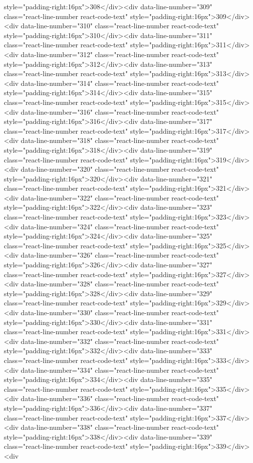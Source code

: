 style="padding-right:16px">308</div><div data-line-number="309" class="react-line-number react-code-text" style="padding-right:16px">309</div><div data-line-number="310" class="react-line-number react-code-text" style="padding-right:16px">310</div><div data-line-number="311" class="react-line-number react-code-text" style="padding-right:16px">311</div><div data-line-number="312" class="react-line-number react-code-text" style="padding-right:16px">312</div><div data-line-number="313" class="react-line-number react-code-text" style="padding-right:16px">313</div><div data-line-number="314" class="react-line-number react-code-text" style="padding-right:16px">314</div><div data-line-number="315" class="react-line-number react-code-text" style="padding-right:16px">315</div><div data-line-number="316" class="react-line-number react-code-text" style="padding-right:16px">316</div><div data-line-number="317" class="react-line-number react-code-text" style="padding-right:16px">317</div><div data-line-number="318" class="react-line-number react-code-text" style="padding-right:16px">318</div><div data-line-number="319" class="react-line-number react-code-text" style="padding-right:16px">319</div><div data-line-number="320" class="react-line-number react-code-text" style="padding-right:16px">320</div><div data-line-number="321" class="react-line-number react-code-text" style="padding-right:16px">321</div><div data-line-number="322" class="react-line-number react-code-text" style="padding-right:16px">322</div><div data-line-number="323" class="react-line-number react-code-text" style="padding-right:16px">323</div><div data-line-number="324" class="react-line-number react-code-text" style="padding-right:16px">324</div><div data-line-number="325" class="react-line-number react-code-text" style="padding-right:16px">325</div><div data-line-number="326" class="react-line-number react-code-text" style="padding-right:16px">326</div><div data-line-number="327" class="react-line-number react-code-text" style="padding-right:16px">327</div><div data-line-number="328" class="react-line-number react-code-text" style="padding-right:16px">328</div><div data-line-number="329" class="react-line-number react-code-text" style="padding-right:16px">329</div><div data-line-number="330" class="react-line-number react-code-text" style="padding-right:16px">330</div><div data-line-number="331" class="react-line-number react-code-text" style="padding-right:16px">331</div><div data-line-number="332" class="react-line-number react-code-text" style="padding-right:16px">332</div><div data-line-number="333" class="react-line-number react-code-text" style="padding-right:16px">333</div><div data-line-number="334" class="react-line-number react-code-text" style="padding-right:16px">334</div><div data-line-number="335" class="react-line-number react-code-text" style="padding-right:16px">335</div><div data-line-number="336" class="react-line-number react-code-text" style="padding-right:16px">336</div><div data-line-number="337" class="react-line-number react-code-text" style="padding-right:16px">337</div><div data-line-number="338" class="react-line-number react-code-text" style="padding-right:16px">338</div><div data-line-number="339" class="react-line-number react-code-text" style="padding-right:16px">339</div><div 